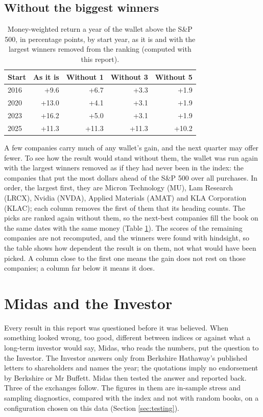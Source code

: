 \documentclass[11pt,a4paper]{article}
\begin{document}
\subsection{Without the biggest winners}
\begin{table}[H]
\centering
\small
\caption{Money-weighted return a year of the wallet above the S\&P 500, in percentage points, by start year, as it is and with the largest winners removed from the ranking (computed with this report).}\label{tab:winners}
\begin{tabular}{l r r r r}
\hline
Start & As it is & Without 1 & Without 3 & Without 5 \\
\hline
2016 & +9.6 & +6.7 & +3.3 & +1.9 \\
2020 & +13.0 & +4.1 & +3.1 & +1.9 \\
2023 & +16.2 & +5.0 & +3.1 & +1.9 \\
2025 & +11.3 & +11.3 & +11.3 & +10.2 \\
\hline
\end{tabular}
\end{table}
A few companies carry much of any wallet's gain, and the next quarter may offer fewer. To see how the result would stand without them, the wallet was run again with the largest winners removed as if they had never been in the index: the companies that put the most dollars ahead of the S\&P 500 over all purchases. In order, the largest first, they are Micron Technology (MU), Lam Research (LRCX), Nvidia (NVDA), Applied Materials (AMAT) and KLA Corporation (KLAC); each column removes the first of them that its heading counts. The picks are ranked again without them, so the next-best companies fill the book on the same dates with the same money (Table \ref{tab:winners}). The scores of the remaining companies are not recomputed, and the winners were found with hindsight, so the table shows how dependent the result is on them, not what would have been picked. A column close to the first one means the gain does not rest on those companies; a column far below it means it does.

\section{Midas and the Investor}
\label{sec:dialogue}
Every result in this report was questioned before it was believed. When something looked wrong, too good, different between indices or against what a long-term investor would say, Midas, who reads the numbers, put the question to the Investor. The Investor answers only from Berkshire Hathaway's published letters to shareholders and names the year; the quotations imply no endorsement by Berkshire or Mr Buffett. Midas then tested the answer and reported back. Three of the exchanges follow. The figures in them are in-sample stress and sampling diagnostics, compared with the index and not with random books, on a configuration chosen on this data (Section \ref{sec:testing}).
\end{document}
